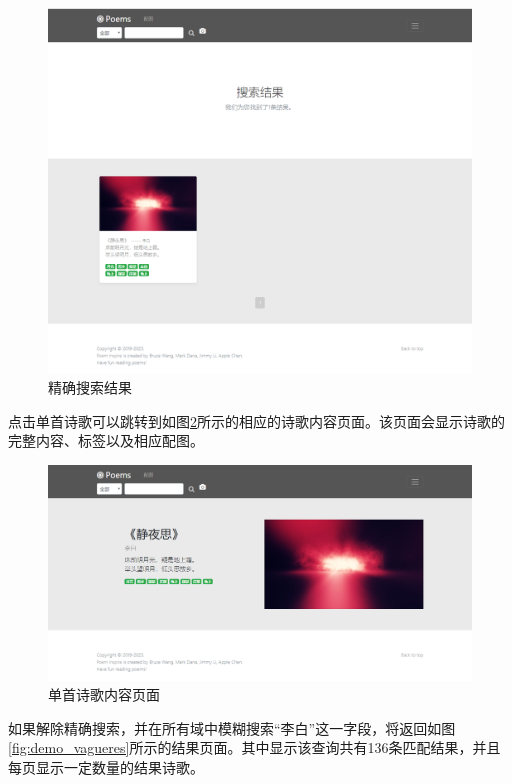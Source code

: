 \documentclass[a4paper, 10pt]{article}
\begin{document}
\begin{figure}[H]
\centering
\includegraphics[scale=0.48]{fig/demo_accres.png}
\caption{精确搜索结果}
\label{fig:demo_accres}
\end{figure}

点击单首诗歌可以跳转到如图\ref{fig:demo_poempage}所示的相应的诗歌内容页面。该页面会显示诗歌的完整内容、标签以及相应配图。

\begin{figure}[H]
\centering
\includegraphics[scale=0.48]{fig/demo_poempage.png}
\caption{单首诗歌内容页面}
\label{fig:demo_poempage}
\end{figure}

如果解除精确搜索，并在所有域中模糊搜索“李白”这一字段，将返回如图\ref{fig:demo_vagueres}所示的结果页面。其中显示该查询共有136条匹配结果，并且每页显示一定数量的结果诗歌。
\end{document}
